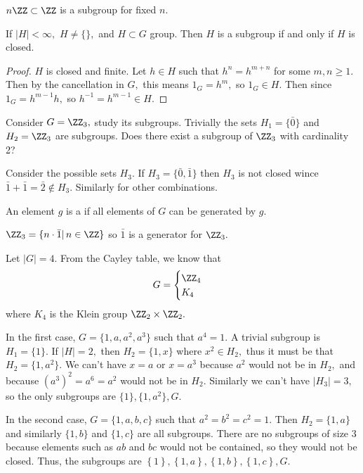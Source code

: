 \documentclass{article}
\begin{document}
\begin{example*}
	$n\ZZ\subset \ZZ$ is a subgroup for fixed $n.$
\end{example*}

\begin{theorem*}
	If $|H|<\infty,$ $H\neq\{\},$ and $H\subset G$ group. Then $H$ is a subgroup if and only if $H$ is closed.
\end{theorem*}

\begin{proof}
	$H$ is closed and finite. Let $h\in H$ such that $h^n=h^{m+n}$ for some $m, n\ge 1.$ Then by the cancellation in $G,$ this means $1_G=h^m,$ so $1_G\in H.$ Then since $1_G=h^{m-1}h,$ so $h^{-1}=h^{m-1}\in H.$
\end{proof}

\begin{example*}
	Consider $G=\ZZ_3,$ study its subgroups. Trivially the sets $H_1=\{\bar{0}\}$ and $H_2=\ZZ_3$ are subgroups. Does there exist a subgroup of $\ZZ_3$ with cardinality 2?

	Consider the possible sets $H_3.$ If $H_3=\{\bar{0}, \bar{1}\}$ then $H_3$ is not closed wince $\bar{1}+\bar{1}=\bar{2}\not\in H_3.$ Similarly for other combinations.
\end{example*}

An element $g$ is a  if all elements of $G$ can be generated by $g.$ 

\begin{example*}
	$\ZZ_3=\{n\cdot\bar{1}|\, n\in\ZZ\}$ so $\bar{1}$ is a generator for $\ZZ_3.$
\end{example*}

\begin{example*}
	Let $|G|=4.$ From the Cayley table, we know that \[G=\begin{cases}
			\ZZ_4 \\ K_4
	\end{cases} \] where $K_4$ is the Klein group $\ZZ_2\times\ZZ_2.$

	In the first case, $G=\{1, a, a^2, a^3\}$ such that $a^4=1.$ A trivial subgroup is $H_1=\{1\}.$ If $|H|=2,$ then $H_2=\{1, x\}$ where $x^2\in H_2,$ thus it must be that $H_2=\{1, a^2\}.$ We can't have $x=a$ or $x=a^3$ because $a^2$ would not be in $H_2,$ and because $(a^3)^2=a^6=a^2$ would not be in $H_2.$ Similarly we can't have $|H_3|=3,$ so the only subgroups are $\{1\}, \{1, a^2\}, G.$

	In the second case, $G=\{1, a, b, c\}$ such that $a^2=b^2=c^2=1.$ Then $H_2=\{1, a\}$ and similarly $\{1, b\}$ and $\{1, c\}$ are all subgroups. There are no subgroups of size 3 because elements such as $ab$ and $bc$ would not be contained, so they would not be closed. Thus, the subgroups are $\left\{ 1 \right\}, \left\{ 1, a \right\}, \left\{ 1, b \right\}, \left\{ 1, c \right\}, G.$
\end{example*}
\end{document}
